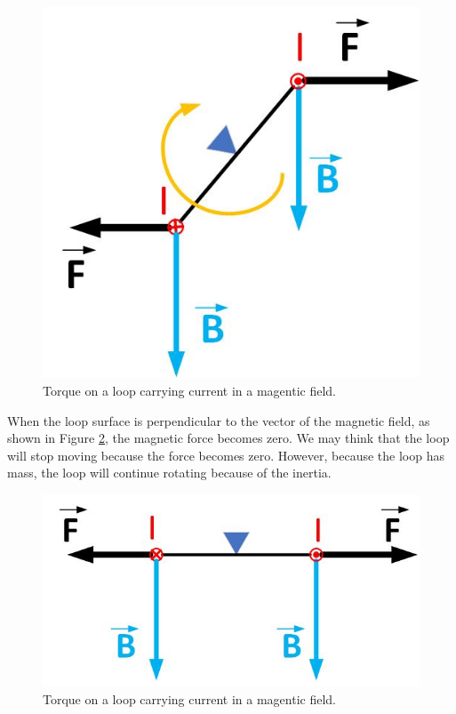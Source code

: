 \documentclass{ximera}
\begin{document}
\begin{figure}[htbp]
\begin{center}
\includegraphics[scale=0.5]{../jpg/conceptMagMom1.jpg}
\end{center}
\caption{Torque on a loop carrying current in a magentic field. }
\label{fig:currentLoopTorque1}
\end{figure}

When the loop surface is perpendicular to the vector of the magnetic field, as shown in Figure \ref{fig:currentLoopTorque2},  the magnetic force becomes zero. We may think that the loop will stop moving because the force becomes zero. However, because the loop has mass, the loop will continue rotating because of the inertia. 



\begin{figure}[htbp]
\begin{center}
\includegraphics[scale=0.5]{../jpg/conceptMagMom2.jpg}
\end{center}
\caption{Torque on a loop carrying current in a magentic field. }
\label{fig:currentLoopTorque2}
\end{figure}
\end{document}
